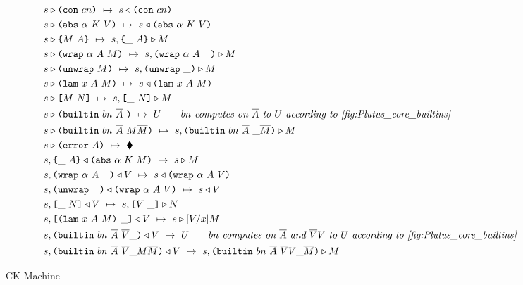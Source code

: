 \documentclass[../plutus-core-specification.tex]{subfiles}
\begin{document}
\begin{figure*}[t]

    \begin{align*}
        &s \triangleright \texttt{(} \texttt{con} ~ cn \texttt{)} ~\mapsto~ s \triangleleft \texttt{(} \texttt{con} ~ cn \texttt{)}\\
        &s \triangleright \texttt{(} \texttt{abs} ~ \alpha ~ K ~ V \texttt{)} ~\mapsto~ s \triangleleft \texttt{(} \texttt{abs} ~ \alpha ~ K ~ V \texttt{)}\\
        &s \triangleright \texttt{\{}M ~ A\texttt{\}} ~\mapsto~ s, \texttt{\{}\_ ~ A\texttt{\}} \triangleright M\\
        &s \triangleright \texttt{(} \texttt{wrap} ~ \alpha ~ A ~ M \texttt{)} ~\mapsto~ s, \texttt{(} \texttt{wrap} ~ \alpha ~ A ~ \_ \texttt{)} \triangleright M\\
        &s \triangleright \texttt{(} \texttt{unwrap} ~ M \texttt{)} ~\mapsto~ s, \texttt{(} \texttt{unwrap} ~ \_ \texttt{)}{} \triangleright M\\
        &s \triangleright \texttt{(} \texttt{lam} ~ x ~ A ~ M \texttt{)} ~\mapsto~ s \triangleleft \texttt{(} \texttt{lam} ~ x ~ A ~ M \texttt{)}\\
        &s \triangleright \texttt{[} M ~ N \texttt{]} ~\mapsto~ s, \texttt{[} \_ ~ N \texttt{]} \triangleright M\\
        &s \triangleright \texttt{(} \texttt{builtin} ~ bn ~ \overline{A} ~  \texttt{)} ~\mapsto~ U \qquad \textit{$bn$ computes on $\overline{A}$ to $U$ according to \ref{fig:Plutus_core_builtins}}\\
        &s \triangleright \texttt{(} \texttt{builtin} ~ bn ~ \overline{A} ~ M \overline{M} \texttt{)} ~\mapsto~ s, \texttt{(} \texttt{builtin} ~ bn ~ \overline{A} ~  \_ \overline{M} \texttt{)} \triangleright M\\
        &s \triangleright \texttt{(} \texttt{error} ~ A \texttt{)} ~\mapsto~ \blacklozenge{}\\
        &s, \texttt{\{}\_ ~ A\texttt{\}} \triangleleft \texttt{(} \texttt{abs} ~ \alpha ~ K ~ M \texttt{)} ~\mapsto~ s \triangleright M\\
        &s, \texttt{(} \texttt{wrap} ~ \alpha ~ A ~ \_ \texttt{)} \triangleleft V ~\mapsto~ s \triangleleft \texttt{(} \texttt{wrap} ~ \alpha ~ A ~ V \texttt{)}\\
        &s, \texttt{(} \texttt{unwrap} ~ \_ \texttt{)}{} \triangleleft \texttt{(} \texttt{wrap} ~ \alpha ~ A ~ V \texttt{)} ~\mapsto~ s \triangleleft V\\
        &s, \texttt{[} \_ ~ N \texttt{]} \triangleleft V ~\mapsto~ s, \texttt{[} V ~ \_ \texttt{]} \triangleright N\\
        &s, \texttt{[} \texttt{(} \texttt{lam} ~ x ~ A ~ M \texttt{)} ~ \_ \texttt{]} \triangleleft V ~\mapsto~ s \triangleright [V/x]M\\
        &s, \texttt{(} \texttt{builtin} ~ bn ~ \overline{A} ~ \overline{V} \_  \texttt{)} \triangleleft V ~\mapsto~ U \qquad \textit{$bn$ computes on $\overline{A}$ and $\overline{V}V$ to $U$ according to \ref{fig:Plutus_core_builtins}}\\
        &s, \texttt{(} \texttt{builtin} ~ bn ~ \overline{A} ~ \overline{V} \_ M \overline{M} \texttt{)} \triangleleft V ~\mapsto~ s, \texttt{(} \texttt{builtin} ~ bn ~ \overline{A} ~ \overline{V} V \_ \overline{M} \texttt{)} \triangleright M\\
    \end{align*}

    \caption{CK Machine}
    \label{fig:Plutus_core_ck_machine}
\end{figure*}
\end{document}
